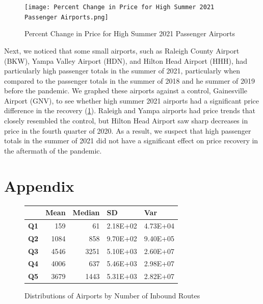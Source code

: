 \documentclass[11pt]{article}
\begin{document}
\begin{figure}
    \centering
    \texttt{[image: Percent Change in Price for High Summer 2021 Passenger Airports.png]}
    \caption{Percent Change in Price for High Summer 2021 Passenger Airports}
    \label{Percent Change in Price for High Summer 2021 Passenger Airports}
\end{figure}
Next, we noticed that some small airports, such as Raleigh County Airport (BKW), Yampa Valley Airport (HDN), and Hilton Head Airport (HHH), had particularly high passenger totals in the summer of 2021, particularly when compared to the passenger totals in the summer of 2018 and he summer of 2019 before the pandemic. We graphed these airports against a control, Gainesville Airport (GNV), to see whether high summer 2021 airports had a significant price difference in the recovery (\cref{Percent Change in Price for High Summer 2021 Passenger Airports}). Raleigh and Yampa airports had price trends that closely resembled the control, but Hilton Head Airport saw sharp decreases in price in the fourth quarter of 2020. As a result, we suspect that high passenger totals in the summer of 2021 did not have a significant effect on price recovery in the aftermath of the pandemic.

\section*{Appendix}

\begin{figure}[]
\begin{tabular}{|l|r|r|r|r|}
\hline
   & \multicolumn{1}{l|}{\textbf{Mean}} & \multicolumn{1}{l|}{\textbf{Median}} & \multicolumn{1}{l|}{\textbf{SD}} & \multicolumn{1}{l|}{\textbf{Var}} \\ \hline
\textbf{Q1} & 159                       & 61                          & 2.18E+02                & 4.73E+04                 \\ \hline
\textbf{Q2} & 1084                      & 858                         & 9.70E+02                & 9.40E+05                 \\ \hline
\textbf{Q3} & 4546                      & 3251                        & 5.10E+03                & 2.60E+07                 \\ \hline
\textbf{Q4} & 4006                      & 637                         & 5.46E+03                & 2.98E+07                 \\ \hline
\textbf{Q5} & 3679                      & 1443                        & 5.31E+03                & 2.82E+07                 \\ \hline
\end{tabular}
\caption{Distributions of Airports by Number of Inbound Routes}
\label{Table_Distribution_Dest}
\end{figure}
\end{document}
